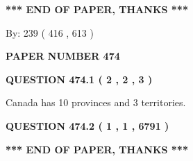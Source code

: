 \documentclass[12pt]{article}
\begin{document}
 
 
 
   
   
 \vspace{0.2in}
 
   
   
   
   
\vspace{1.0in} 
{\textbf{\large{ *** END OF PAPER, THANKS *** }}} 
   
   
\hspace{1.0in} By: 
 239 ( 416 ,  613 )
   
   
   
   
\newpage 
\setcounter{page}{ 
   474001 } 
   
   
   
   
 {\textbf{ \Large{ PAPER NUMBER  474  }}}
   
   
\vspace{0.2in}
   
   
   
   
   
   
 \vspace{0.2in}
 
 
 
 
   
   
  
\vspace{0.2in}
  
{\textbf{\Large{QUESTION
474.1 
 ( 2 , 2 , 3 )
}}}
  
  
 
 
\noindent{}
 
 
Canada has 10  provinces and 3 territories.
 
 
 
 
  
\vspace{0.2in}
  
{\textbf{\Large{QUESTION
474.2 
 ( 1 , 1 , 6791 )
}}}
  
  
   
   
 \vspace{0.2in}
 
   
   
   
   
\vspace{1.0in} 
{\textbf{\large{ *** END OF PAPER, THANKS *** }}} 
   
\end{document}
